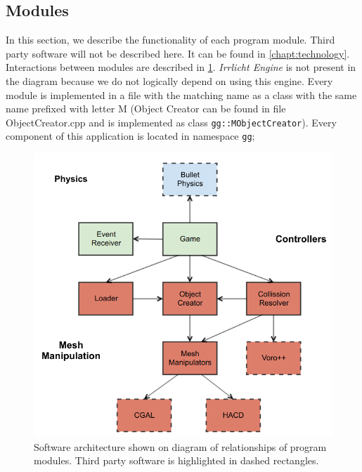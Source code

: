 \subsection*{Modules}
In this section, we describe the functionality of each program module. Third party software will not be described here. It can be found in \cref{chapt:technology}. Interactions between modules are described in \cref{fig:modules}. \emph{Irrlicht Engine} is not present in the diagram because we do not logically depend on using this engine. Every module is implemented in a file with the matching name as a class with the same name prefixed with letter M (Object Creator can be found in file ObjectCreator.cpp and is implemented as class {\tt gg::MObjectCreator}). Every component of this application is located in namespace {\tt gg};

\begin{figure}[ht!]
        \centering
        \includegraphics[width=\textwidth]{img/objectmodel}
        \caption{Software architecture shown on diagram of relationships of program modules. Third party software is highlighted in dashed rectangles.}
        \label{fig:modules}
\end{figure}

